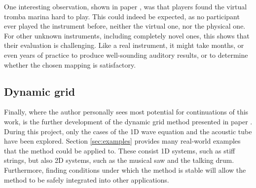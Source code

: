 One interesting observation, shown in paper \citeP[E], was that players found the virtual tromba marina hard to play. This could indeed be expected, as no participant ever played the instrument before, neither the virtual one, nor the physical one. For other unknown instruments, including completely novel ones, this shows that their evaluation is challenging. Like a real instrument, it might take months, or even years of practice to produce well-sounding auditory results, or to determine whether the chosen mapping is satisfactory. 




\subsection{Dynamic grid}
Finally, where the author personally sees most potential for continuations of this work, is the further development of the dynamic grid method presented in paper \citeP[G]. During this project, only the cases of the 1D wave equation and the acoustic tube have been explored. Section \ref{sec:examples} provides many real-world examples that the method could be applied to. These consist 1D systems, such as stiff strings, but also 2D systems, such as the musical saw and the talking drum. Furthermore, finding conditions under which the method is stable will allow the method to be safely integrated into other applications.

